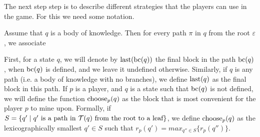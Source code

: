 The next step step is to describe different strategies that the players can use in the game. For this we need some notation. 

Assume that $q$ is a body of knowledge. Then for every path $\pi$ in $q$ from the root $\varepsilon$, we associate 


First, for a state $q$, we will denote by $\text{\rm last}(\text{bc}(q))$ the final block in the path $\text{bc}(q)$, when $\text{bc}(q)$ is defined, and we leave it undefined otherwise. Similarly, if $q$ is any path (i.e. a body of knowledge with no branches), we define $\text{\rm last}(q)$ as the final block in this path. If $p$ is a player, and $q$ is a state such that $\text{bc}(q)$ is not defined, we will define the function $\text{\rm choose}_p(q)$ as the block that is most convenient for the player $p$ to mine upon. Formally, if $S=\{ q'\mid q' \text{ is a path in } \mathcal{T}(q) \text{ from the root to a leaf}\}$, we define $\text{\rm choose}_p(q)$ as the lexicographically smallest $q'\in S$ such that $r_p(q')=max_{q''\in S} \{r_p(q'')\}$.

%
%
%
%
%
%


